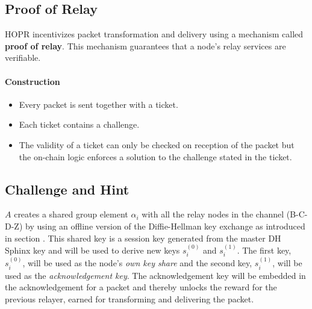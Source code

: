 \subsection{Proof of Relay}
\label{sec:proofofrelay}

HOPR incentivizes packet transformation and delivery using a mechanism called \textbf{proof of relay}. This mechanism guarantees that a node's relay services are verifiable.

\paragraph{Construction}

\begin{itemize}
    \item Every packet is sent together with a ticket.
    \item Each ticket contains a challenge.
    \item The validity of a ticket can only be checked on reception of the packet but the on-chain logic enforces a solution to the challenge stated in the ticket.
\end{itemize}

\subsection{Challenge and Hint}
\label{sec:PoR:Challenge}

$A$ creates a shared group element $\alpha_i$ with all the relay nodes in the channel (B-C-D-Z) by using an offline version of the Diffie-Hellman key exchange as introduced in section . This shared key is a session key generated from the master DH Sphinx key and will be used to derive new keys $s_i^{(0)}$ and $s_{i}^{(1)}$.  The first key, $s_i^{(0)}$, will be used as the node's \textit{own key share} and the second key, $s_i^{(1)}$, will be used as the \textit{acknowledgement key}. The acknowledgement key will be embedded in the acknowledgement for a packet and thereby unlocks the reward for the previous relayer, earned for transforming and delivering the packet.

